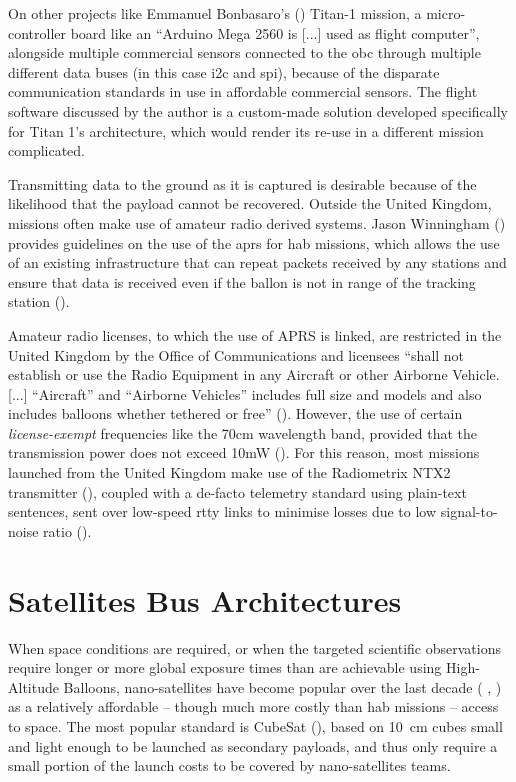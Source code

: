 On other projects like Emmanuel Bonbasaro's (\cite{Bombasaro2015}) Titan-1 mission, a micro-controller board like an ``Arduino Mega 2560 is [...] used as flight computer'', alongside multiple commercial sensors connected to the \acrshort{obc} through multiple different data buses (in this case \acrfull{i2c} and \acrfull{spi}), because of the disparate communication standards in use in affordable commercial sensors. The flight software discussed by the author is a custom-made solution developed specifically for Titan 1's architecture, which would render its re-use in a different mission complicated.

Transmitting data to the ground as it is captured is desirable because of the likelihood that the payload cannot be recovered. Outside the United Kingdom, missions often make use of amateur radio derived systems. Jason Winningham (\cite{Winningham2006}) provides guidelines on the use of the \acrfull{aprs} for \acrshort{hab} missions, which allows the use of an existing infrastructure that can repeat packets received by any stations and ensure that data is received even if the ballon is not in range of the tracking station (\cite{TheAPRSWorkingGroup2000}).

Amateur radio licenses, to which the use of APRS is linked, are restricted in the United Kingdom by the Office of Communications and licensees ``shall not establish or use the Radio Equipment in any Aircraft or other Airborne Vehicle. [...] ``Aircraft'' and ``Airborne Vehicles'' includes full size and models and also includes balloons whether tethered or free'' (\cite{Ofcom2017}). However, the use of certain \textit{license-exempt} frequencies like the 70cm wavelength band, provided that the transmission power does not exceed 10mW (\cite{Ofcom2014}). For this reason, most missions launched from the United Kingdom make use of the Radiometrix NTX2 transmitter (\cite{radiometrix2012}), coupled with a de-facto telemetry standard using plain-text sentences, sent over low-speed  \acrfull{rtty} links to minimise losses due to low signal-to-noise ratio (\cite{UKHAS2015}).

\section{Satellites Bus Architectures}

When space conditions are required, or when the targeted scientific observations require longer or more global exposure times than are achievable using High-Altitude Balloons, nano-satellites have become popular over the last decade ( \cite{McDowell2017a}, \cite{McDowell2017}) as a relatively affordable – though much more costly than \acrshort{hab} missions – access to space. The most popular standard is CubeSat (\cite{Heidt2000}), based on \SI{10}{\centi\metre} cubes small and light enough to be launched as secondary payloads, and thus only require a small portion of the launch costs to be covered by nano-satellites teams.


